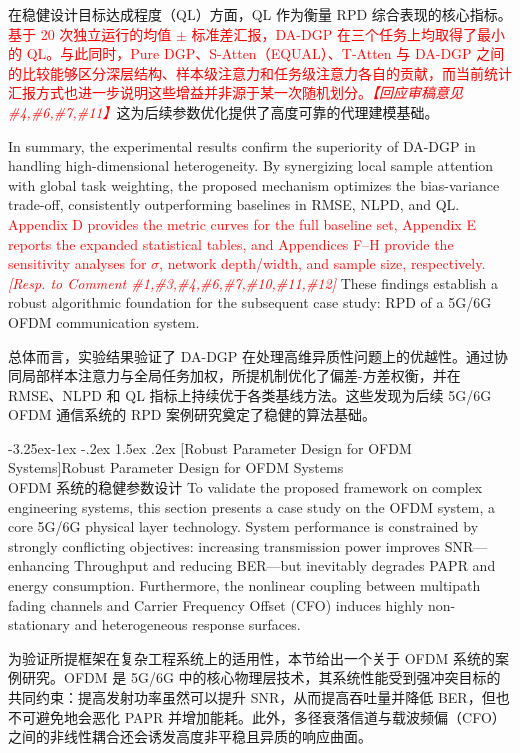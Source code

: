 \documentclass[11pt]{article}
\makeatletter
\renewcommand\subsection{\@startsection{subsection}{2}{\z@}%
                                         {-3.25ex\@plus -1ex \@minus -.2ex}%
                                         {1.5ex \@plus .2ex}%
                                         {\normalfont\fontfamily{phv}\fontsize{14}{17}\bfseries}}
\newcommand{\bisubsection}[2]{\subsection[#1]{#1\protect\\#2}}
\makeatother
\begin{document}
在稳健设计目标达成程度（QL）方面，QL 作为衡量 RPD 综合表现的核心指标。\textcolor{red}{基于 20 次独立运行的均值 $\pm$ 标准差汇报，DA-DGP 在三个任务上均取得了最小的 QL。与此同时，Pure DGP、S-Atten（EQUAL）、T-Atten 与 DA-DGP 之间的比较能够区分深层结构、样本级注意力和任务级注意力各自的贡献，而当前统计汇报方式也进一步说明这些增益并非源于某一次随机划分。\textit{【回应审稿意见 \#4,\#6,\#7,\#11】}}这为后续参数优化提供了高度可靠的代理建模基础。

In summary, the experimental results confirm the superiority of DA-DGP in handling high-dimensional heterogeneity. By synergizing local sample attention with global task weighting, the proposed mechanism optimizes the bias-variance trade-off, consistently outperforming baselines in RMSE, NLPD, and QL. \textcolor{red}{Appendix D provides the metric curves for the full baseline set, Appendix E reports the expanded statistical tables, and Appendices F--H provide the sensitivity analyses for $\sigma$, network depth/width, and sample size, respectively. \textit{[Resp. to Comment \#1,\#3,\#4,\#6,\#7,\#10,\#11,\#12]}} These findings establish a robust algorithmic foundation for the subsequent case study: RPD of a 5G/6G OFDM communication system.

总体而言，实验结果验证了 DA-DGP 在处理高维异质性问题上的优越性。通过协同局部样本注意力与全局任务加权，所提机制优化了偏差-方差权衡，并在 RMSE、NLPD 和 QL 指标上持续优于各类基线方法。这些发现为后续 5G/6G OFDM 通信系统的 RPD 案例研究奠定了稳健的算法基础。


\bisubsection{Robust Parameter Design for OFDM Systems}{OFDM 系统的稳健参数设计}\label{s:sec5.1}
To validate the proposed framework on complex engineering systems, this section presents a case study on the OFDM system, a core 5G/6G physical layer technology. System performance is constrained by strongly conflicting objectives: increasing transmission power improves SNR—enhancing Throughput and reducing BER—but inevitably degrades PAPR and energy consumption. Furthermore, the nonlinear coupling between multipath fading channels and Carrier Frequency Offset (CFO) induces highly non-stationary and heterogeneous response surfaces.

为验证所提框架在复杂工程系统上的适用性，本节给出一个关于 OFDM 系统的案例研究。OFDM 是 5G/6G 中的核心物理层技术，其系统性能受到强冲突目标的共同约束：提高发射功率虽然可以提升 SNR，从而提高吞吐量并降低 BER，但也不可避免地会恶化 PAPR 并增加能耗。此外，多径衰落信道与载波频偏（CFO）之间的非线性耦合还会诱发高度非平稳且异质的响应曲面。
\end{document}
